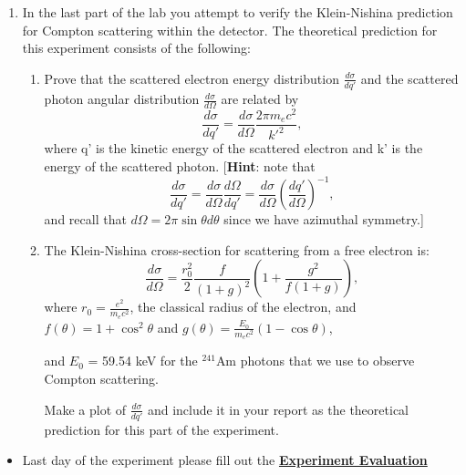 \documentclass{../lab}
\begin{document}
\begin{enumerate}
    \item In the last part of the lab you attempt to verify the Klein-Nishina prediction for Compton scattering within the detector. The theoretical prediction for this experiment consists of the following:
    \begin{enumerate}
        \item Prove that the scattered electron energy distribution $\frac{d\sigma}{dq'}$ and the scattered photon angular distribution $\frac{d\sigma}{d\Omega}$ are related by
        \begin{equation}
            \frac{d\sigma}{dq'}=\frac{d\sigma}{d\Omega}\frac{2\pi m_ec^2}{k'^2},
        \end{equation}
        where q' is the kinetic energy of the scattered electron and k' is the energy of the scattered photon. [\textbf{Hint}: note that
        \begin{equation}
            \frac{d\sigma}{dq'} = \frac{d\sigma}{d\Omega} \frac{d\Omega}{dq'} = \frac{d\sigma}{d\Omega} \left(\frac{dq'}{d\Omega} \right)^{-1},
        \end{equation}
        and recall that $d\Omega = 2 \pi \sin\theta d\theta$ since we have azimuthal symmetry.]
        
        \item The Klein-Nishina cross-section for scattering from a free electron is:
        \begin{equation}
            \frac{d\sigma}{d\Omega} = \frac{r_0^2}{2} \frac{f}{(1+g)^2} \left(1 + \frac{g^2}{f(1+g)}\right),
        \end{equation}
        where $r_0=\frac{e^2}{m_e c^2}$, the classical radius of the electron, and $f(\theta) = 1 + \cos^2 \theta$ and $g(\theta) = \frac{E_0}{m_ec^2} (1-\cos \theta)$,
        
        and $E_0$ = 59.54 keV for the $^{241}$Am photons that we use to observe Compton scattering.
        
        Make a plot of $\frac{d\sigma}{dq'}$ and include it in your report as the theoretical prediction for this part of the experiment.
    \end{enumerate}
    
\end{enumerate}

\begin{itemize}
    \item Last day of the experiment please fill out the \href{\ExperimentEvaluation}{\textbf{Experiment Evaluation}}

\end{itemize}
\end{document}
